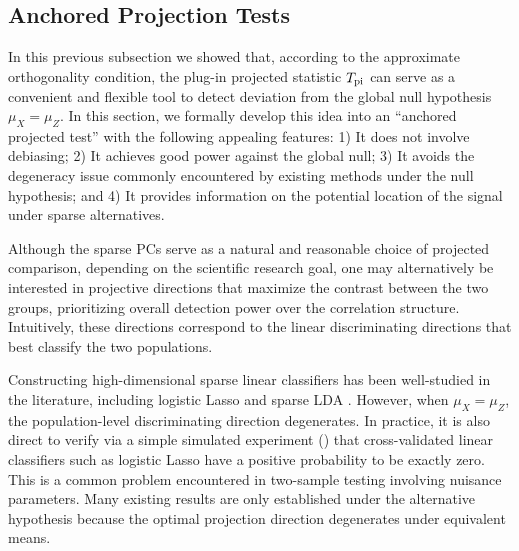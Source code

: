 \documentclass[11pt]{article}
\begin{document}
\subsection{Anchored Projection Tests}
\label{section: anchored lasso}

In this previous subsection we showed that, according to the approximate orthogonality condition, the plug-in projected statistic $T_{\rm pi}$ can serve as a convenient and flexible tool to detect deviation from the global null hypothesis $\mu_X=\mu_Z$. In this section, we formally develop this idea into an ``anchored projected test'' with the following appealing features: 1) It does not involve debiasing; 2) It achieves good power against the global null; 3) It avoids the degeneracy issue commonly encountered by existing methods under the null hypothesis; and 4) It provides information on the potential location of the signal under sparse alternatives.


Although the sparse PCs serve as a natural and reasonable choice of projected comparison,
depending on the scientific research goal, one may alternatively be interested in projective directions that maximize the contrast between the two groups, prioritizing overall detection power over the correlation structure. Intuitively, these directions correspond to the linear discriminating directions that best classify the two populations.

Constructing high-dimensional sparse linear classifiers has been well-studied in the literature, including logistic Lasso \citep{tibshirani1996regression,van2008high} and sparse LDA \citep{cai2011direct}. However, when $\mu_X = \mu_Z$, the population-level discriminating direction degenerates. In practice, it is also direct to verify via a simple simulated experiment () that cross-validated linear classifiers such as logistic Lasso have a positive probability to be exactly zero. This is a common problem encountered in two-sample testing involving nuisance parameters. Many existing results \cite{liu2022multiple} are only established under the alternative hypothesis because the optimal projection direction degenerates under equivalent means.
\end{document}
